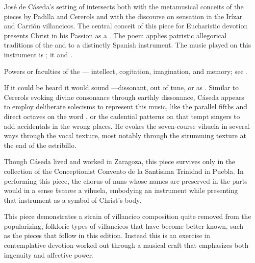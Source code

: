 José de Cáseda's setting of  intersects 
both with the metamusical conceits of the pieces by Padilla and Cererols and 
with the discourse on sensation in the Irízar and Carrión villancicos.
The central conceit of this piece for Eucharistic devotion presents Christ in 
his Passion as a .%
    \Autocite[375--405]{Cashner:PhD}
The poem applies patristic allegorical traditions of the  and 
 to a distinctly Spanish instrument.
The music played on this instrument is ; it 
 and .%
\begin{Footnote}
    Powers or faculties of the ---
    intellect, cogitation, imagination, and memory; see
    \autocite[439--484]{LuisdeGranada-Balcells:SimboloPtI}.
\end{Footnote}
If it could be heard it would sound ---dissonant, out of tune, or 
as . 
Similar to Cererols evoking divine consonance through earthly dissonance, 
Cáseda appears to employ deliberate solecisms to represent this 
music, like the parallel fifths and direct octaves on the 
word , or the cadential patterns on 
that tempt singers to add accidentals in the wrong places.
He evokes the seven-course vihuela in several ways through the vocal texture, 
most notably through the strumming texture at the end of the estribillo.

Though Cáseda lived and worked in Zaragoza, this piece survives only in the
collection of the Conceptionist Convento de la Santísima Trinidad in Puebla.%
    \Autocite{Favila:PhD}
In performing this piece, the chorus of nuns whose names are preserved in the 
parts would in a sense \emph{become} a vihuela, embodying an instrument while 
presenting that instrument as a symbol of Christ's body.

This piece demonstrates a strain of villancico composition quite removed from 
the popularizing, folkloric types of villancicos that have become better known,
such as the pieces that follow in this edition.  
Instead this is an exercise in contemplative devotion worked out through a
musical craft that emphasizes both ingenuity and affective power.


